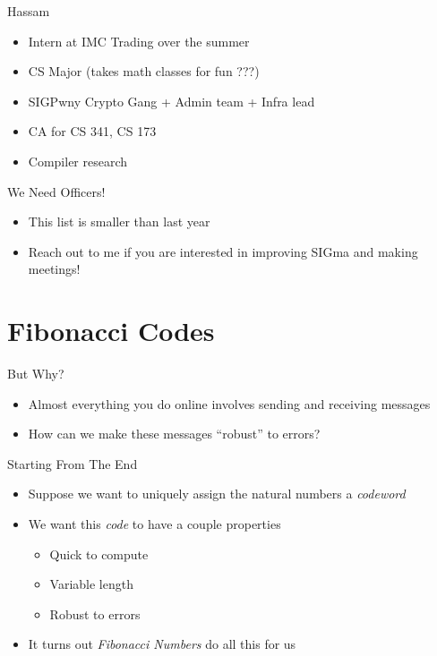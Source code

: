 \documentclass[aspectratio=169]{beamer}
\begin{document}
\begin{frame}{Hassam}
    \begin{itemize}
        \item Intern at IMC Trading over the summer
        \item CS Major (takes math classes for fun ???)
        \item SIGPwny Crypto Gang + Admin team + Infra lead
        \item CA for CS 341, CS 173
        \item Compiler research
    \end{itemize}
\end{frame}

\begin{frame}{We Need Officers!}
    \begin{itemize}
        \item This list is smaller than last year \pause
        \item Reach out to me if you are interested in improving SIGma and making meetings!
    \end{itemize}
\end{frame}

\section{Fibonacci Codes}
\frame{\sectionpage}

\begin{frame}{But Why?}
    \begin{itemize}
        \item Almost everything you do online involves sending and receiving messages \pause
        \item How can we make these messages ``robust'' to errors?
    \end{itemize}
\end{frame}

\begin{frame}{Starting From The End}
    \begin{itemize}
        \item Suppose we want to uniquely assign the natural numbers a \emph{codeword} \pause
        \item We want this \emph{code} to have a couple properties
        \begin{itemize}
            \item Quick to compute
            \item Variable length
            \item Robust to errors
        \end{itemize} \pause
        \item It turns out \emph{Fibonacci Numbers} do all this for us
    \end{itemize}
\end{frame}
\end{document}
